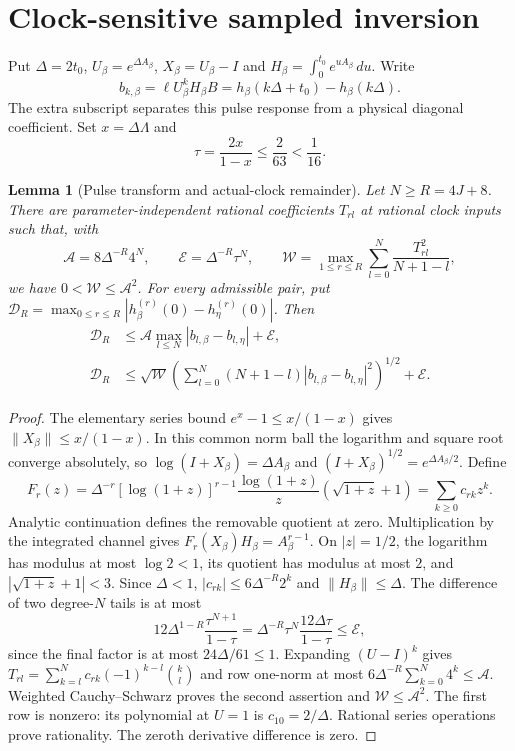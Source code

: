 \documentclass[11pt,reqno]{amsart}
\newtheorem{lemma}[theorem]{Lemma}
\theoremstyle{remark}\newtheorem{remark}[theorem]{Remark}
\begin{document}


\section{Clock-sensitive sampled inversion}
\label{sec:sampled}
Put $\Delta=2t_0$, $U_\beta=e^{\Delta A_\beta}$,
$X_\beta=U_\beta-I$ and $H_\beta=\int_0^{t_0}e^{uA_\beta}\,du$. Write
\[
 b_{k,\beta}=\ell U_\beta^kH_\beta B
   =h_\beta(k\Delta+t_0)-h_\beta(k\Delta).
\]
The extra subscript separates this pulse response from a physical diagonal
coefficient. Set $x=\Delta\Lambda$ and
\begin{equation}
 \tau=\frac{2x}{1-x}\le\frac2{63}<\frac1{16}.
 \label{eq:tau}
\end{equation}

\begin{lemma}[Pulse transform and actual-clock remainder]
\label{lem:sampled}
Let $N\ge R=4J+8$. There are parameter-independent rational coefficients
$T_{rl}$ at rational clock inputs such that, with
\begin{equation}
 \mathcal A=8\Delta^{-R}4^N,\qquad
 \mathcal E=\Delta^{-R}\tau^N,\qquad
 \mathcal W=\max_{1\le r\le R}\sum_{l=0}^N\frac{T_{rl}^2}{N+1-l},
 \label{eq:transform-budgets}
\end{equation}
we have $0<\mathcal W\le\mathcal A^2$. For every admissible pair, put
$\mathcal D_R=\max_{0\le r\le R}|h_\beta^{(r)}(0)-h_\eta^{(r)}(0)|$.
Then
\begin{align}
 \mathcal D_R&\le\mathcal A\max_{l\le N}|b_{l,\beta}-b_{l,\eta}|+\mathcal E,
 \label{eq:sampled-infty}\\
 \mathcal D_R&\le\sqrt{\mathcal W}
 \left(\sum_{l=0}^N(N+1-l)|b_{l,\beta}-b_{l,\eta}|^2\right)^{1/2}
 +\mathcal E.\label{eq:sampled-weighted}
\end{align}
\end{lemma}
\begin{proof}
The elementary series bound $e^x-1\le x/(1-x)$ gives
$\|X_\beta\|\le x/(1-x)$. In this common norm ball the logarithm and square
root converge absolutely, so $\log(I+X_\beta)=\Delta A_\beta$ and
$(I+X_\beta)^{1/2}=e^{\Delta A_\beta/2}$. Define
\[
 F_r(z)=\Delta^{-r}[\log(1+z)]^{r-1}
 \frac{\log(1+z)}{z}(\sqrt{1+z}+1)=\sum_{k\ge0}c_{rk}z^k.
\]
Analytic continuation defines the removable quotient at zero. Multiplication
by the integrated channel gives $F_r(X_\beta)H_\beta=A_\beta^{r-1}$.
On $|z|=1/2$, the logarithm has modulus at most $\log2<1$, its quotient
has modulus at most $2$, and $|\sqrt{1+z}+1|<3$. Since $\Delta<1$,
$|c_{rk}|\le6\Delta^{-R}2^k$ and $\|H_\beta\|\le\Delta$.
The difference of two degree-$N$ tails is at most
\[
 12\Delta^{1-R}\frac{\tau^{N+1}}{1-\tau}
 =\Delta^{-R}\tau^N\frac{12\Delta\tau}{1-\tau}
 \le\mathcal E,
\]
since the final factor is at most $24\Delta/61\le1$.
Expanding $(U-I)^k$ gives
$T_{rl}=\sum_{k=l}^N c_{rk}(-1)^{k-l}\binom{k}{l}$ and row one-norm at
most $6\Delta^{-R}\sum_{k=0}^N4^k\le\mathcal A$.
Weighted Cauchy--Schwarz proves the second assertion and
$\mathcal W\le\mathcal A^2$. The first row is nonzero: its polynomial at
$U=1$ is $c_{10}=2/\Delta$. Rational series operations prove rationality.
The zeroth derivative difference is zero.
\end{proof}
\end{document}
